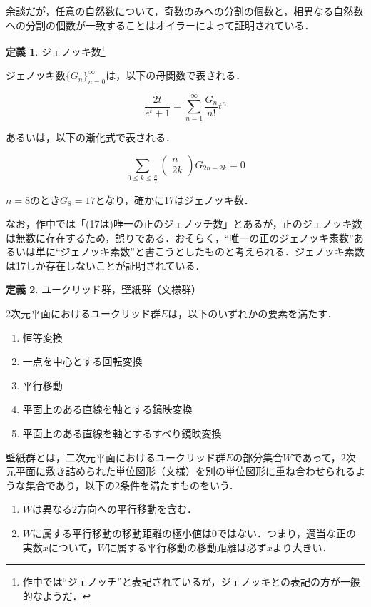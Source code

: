 \documentclass[10pt, a5paper, twoside]{jsarticle}
\theoremstyle{definition}
\newtheorem{dfn}{定義}
\begin{document}
			余談だが，任意の自然数について，奇数のみへの分割の個数と，相異なる自然数への分割の個数が一致することはオイラーによって証明されている\cite{ono}．

			\begin{dfn}

				ジェノッキ数\footnote{作中では“ジェノッチ”と表記されているが，ジェノッキとの表記の方が一般的なようだ．}\cite{seki}

				ジェノッキ数$\{ G_n \}^{\infty}_{n=0}$は，以下の母関数で表される．

				$$\frac{2 t}{e^t + 1} = \displaystyle \sum^{\infty}_{n=1} \frac{G_n}{n !} t^n$$

				あるいは，以下の漸化式で表される．

				$$\displaystyle \sum_{0 \le k \le \frac{n}{2}} \begin{pmatrix} n \\ 2k \end{pmatrix} G_{2n-2k} = 0$$
				
			\end{dfn}

			$n = 8$のとき$G_8 = 17$となり，確かに17はジェノッキ数．

			なお，作中では「(17は)唯一の正のジェノッチ数」とあるが，正のジェノッキ数は無数に存在するため，誤りである．おそらく，“唯一の正のジェノッキ素数”あるいは単に“ジェノッキ素数”と書こうとしたものと考えられる．ジェノッキ素数は17しか存在しないことが証明されている\cite{seki}．

			\begin{dfn}
				
				ユークリッド群，壁紙群（文様群）

				2次元平面におけるユークリッド群$E$は，以下のいずれかの要素を満たす．

				\begin{enumerate}
					\item 恒等変換

					\item 一点を中心とする回転変換

					\item 平行移動

					\item 平面上のある直線を軸とする鏡映変換

					\item 平面上のある直線を軸とするすべり鏡映変換
				\end{enumerate}

				壁紙群とは，二次元平面におけるユークリッド群$E$の部分集合$W$であって，2次元平面に敷き詰められた単位図形（文様）を別の単位図形に重ね合わせられるような集合であり，以下の2条件を満たすものをいう．

				\begin{enumerate}
					\item $W$は異なる2方向への平行移動を含む．

					\item $W$に属する平行移動の移動距離の極小値は0ではない．つまり，適当な正の実数$x$について，$W$に属する平行移動の移動距離は必ず$x$より大きい． 
				\end{enumerate}

			\end{dfn}
\end{document}
